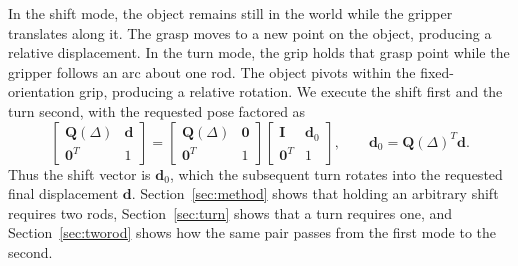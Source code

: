In the shift mode, the object remains still in the world while the gripper translates along it. The grasp moves to a new point on the object, producing a relative displacement. In the turn mode, the grip holds that grasp point while the gripper follows an arc about one rod. The object pivots within the fixed-orientation grip, producing a relative rotation. We execute the shift first and the turn second, with the requested pose factored as
\begin{equation}
  \begin{bmatrix}\mathbf Q(\Delta)&\mathbf d\\\mathbf 0^T&1\end{bmatrix}
  =\begin{bmatrix}\mathbf Q(\Delta)&\mathbf 0\\\mathbf 0^T&1\end{bmatrix}
   \begin{bmatrix}\mathbf I&\mathbf d_0\\\mathbf 0^T&1\end{bmatrix},
  \qquad \mathbf d_0=\mathbf Q(\Delta)^T\mathbf d.
  \label{eq:factor}
\end{equation}
Thus the shift vector is $\mathbf d_0$, which the subsequent turn rotates into the requested final displacement $\mathbf d$. Section~\ref{sec:method} shows that holding an arbitrary shift requires two rods, Section~\ref{sec:turn} shows that a turn requires one, and Section~\ref{sec:tworod} shows how the same pair passes from the first mode to the second.
